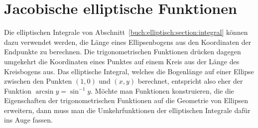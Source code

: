 %
%
%
\section{Jacobische elliptische Funktionen
\label{buch:elliptisch:section:jacobi}}
Die elliptischen Integrale von
Abschnitt~\ref{buch:elliptisch:section:integral}
können dazu verwendet werden, die Länge eines Ellipsenbogens aus
den Koordinaten der Endpunkte zu berechnen.
Die trigonometrischen Funktionen drücken dagegen umgekehrt die
Koordinaten eines Punktes auf einem Kreis aus der Länge des
Kreisbogens aus.
Das elliptische Integral, welches die Bogenlänge auf einer Ellipse zwischen
den Punkten $(1,0)$ und $(x,y)$ berechnet, entspricht also eher der Funktion
$\arcsin y=\sin^{-1}y$.
Möchte man Funktionen konstruieren, die die Eigenschaften der 
trigonometrischen Funktionen auf die Geometrie von Ellipsen erweitern,
dann muss man die Umkehrfunktionen der elliptischen Integrale dafür ins
Auge fassen.





